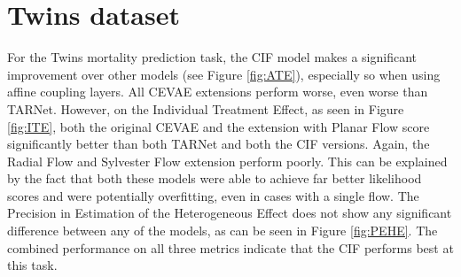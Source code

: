 \documentclass{report}
\begin{document}
\section{Twins dataset}
For the Twins mortality prediction task, the CIF model makes a significant improvement over other models (see Figure \ref{fig:ATE}), especially so when using affine coupling layers. All CEVAE extensions perform worse, even worse than TARNet. However, on the Individual Treatment Effect, as seen in Figure \ref{fig:ITE}, both the original CEVAE and the extension with Planar Flow score significantly better than both TARNet and both the CIF versions. Again, the Radial Flow and Sylvester Flow extension perform poorly. This can be explained by the fact that both these models were able to achieve far better likelihood scores and were potentially overfitting, even in cases with a single flow. The Precision in Estimation of the Heterogeneous Effect does not show any significant difference between any of the models, as can be seen in Figure \ref{fig:PEHE}. The combined performance on all three metrics indicate that the CIF performs best at this task.

\setlength{\belowcaptionskip}{-5pt}
\end{document}
